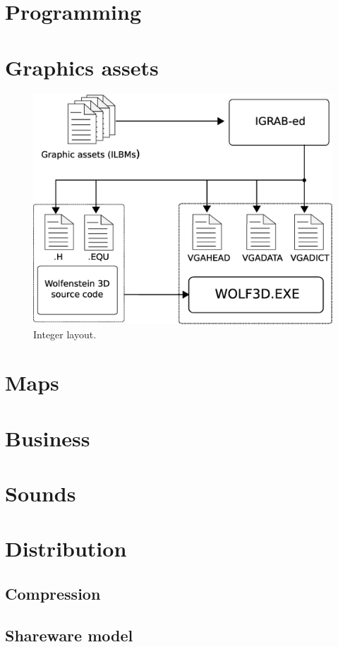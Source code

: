 \documentclass[book.tex]{subfiles}
\begin{document}
\section{Programming}
\section{Graphics assets}

\begin{figure}[H]
\centering
 \includegraphics[scale=0.4]{imgs/drawing_plain.eps}
 \caption{Integer layout.} \label{fig:mips}
 \end{figure}

\section{Maps}
\section{Business}
\section{Sounds}
\section{Distribution}
	\subsection{Compression}
	\subsection{Shareware model}
\end{document}

